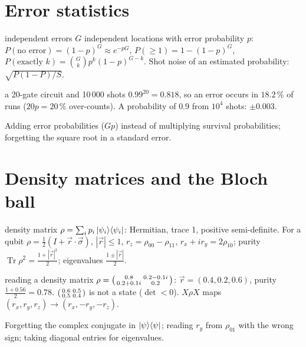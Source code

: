 \documentclass[11pt,a4paper,openany]{book}
\newcounter{wex}[chapter]
\begin{document}
\section{Error statistics}
\begin{keyres}{independent errors}
$G$ independent locations with error probability $p$: $P(\text{no error}) = (1-p)^G \approx e^{-pG}$, $P(\ge1) = 1 - (1-p)^G$,
$P(\text{exactly }k) = \binom Gkp^k(1-p)^{G-k}$. Shot noise of an estimated probability: $\sqrt{P(1-P)/S}$.
\end{keyres}
\begin{wexample}{a 20-gate circuit and 10\,000 shots}
$0.99^{20} = 0.818$, so an error occurs in $18.2\,\%$ of runs ($20p = 20\,\%$ over-counts). A probability of $0.9$ from $10^4$ shots: $\pm0.003$.
\end{wexample}
\begin{trap}
Adding error probabilities ($Gp$) instead of multiplying survival probabilities; forgetting the square root in a standard error.
\end{trap}

\section{Density matrices and the Bloch ball}
\begin{defn}{density matrix}
$\rho = \sum_ip_i\ket{\psi_i}\!\bra{\psi_i}$: Hermitian, trace 1, positive semi-definite. For a qubit $\rho = \frac12(I + \vec r\cdot\vec\sigma)$, $|\vec r| \le 1$,
$r_z = \rho_{00} - \rho_{11}$, $r_x + ir_y = 2\rho_{10}$; purity $\operatorname{Tr}\rho^2 = \frac{1 + |\vec r|^2}{2}$; eigenvalues $\frac{1\pm|\vec r|}{2}$.
\end{defn}
\begin{wexample}{reading a density matrix}
$\rho = \begin{psmallmatrix}0.8 & 0.2-0.1i\\ 0.2+0.1i & 0.2\end{psmallmatrix}$: $\vec r = (0.4, 0.2, 0.6)$, purity $\frac{1 + 0.56}{2} = 0.78$.
$\begin{psmallmatrix}0.6&0.5\\0.5&0.4\end{psmallmatrix}$ is not a state ($\det < 0$). $X\rho X$ maps $(r_x, r_y, r_z) \to (r_x, -r_y, -r_z)$.
\end{wexample}
\begin{trap}
Forgetting the complex conjugate in $\ket\psi\!\bra\psi$; reading $r_y$ from $\rho_{01}$ with the wrong sign; taking diagonal entries for eigenvalues.
\end{trap}
\end{document}
